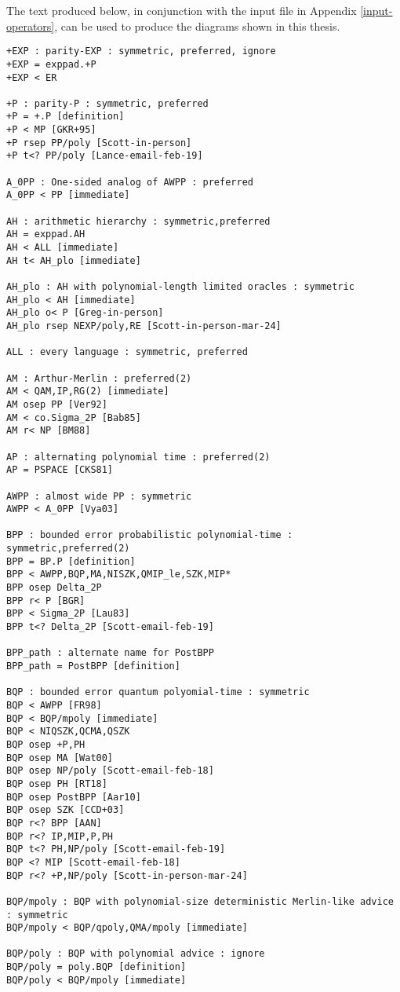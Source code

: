 The text produced below, in conjunction with the input file in Appendix 
\ref{input-operators}, can be used to produce the diagrams shown in this thesis.

\begin{verbatim}
+EXP : parity-EXP : symmetric, preferred, ignore
+EXP = exppad.+P
+EXP < ER

+P : parity-P : symmetric, preferred
+P = +.P [definition]
+P < MP [GKR+95]
+P rsep PP/poly [Scott-in-person]
+P t<? PP/poly [Lance-email-feb-19]

A_0PP : One-sided analog of AWPP : preferred
A_0PP < PP [immediate]

AH : arithmetic hierarchy : symmetric,preferred
AH = exppad.AH
AH < ALL [immediate]
AH t< AH_plo [immediate]

AH_plo : AH with polynomial-length limited oracles : symmetric
AH_plo < AH [immediate]
AH_plo o< P [Greg-in-person]
AH_plo rsep NEXP/poly,RE [Scott-in-person-mar-24]

ALL : every language : symmetric, preferred

AM : Arthur-Merlin : preferred(2)
AM < QAM,IP,RG(2) [immediate]
AM osep PP [Ver92]
AM < co.Sigma_2P [Bab85]
AM r< NP [BM88]

AP : alternating polynomial time : preferred(2)
AP = PSPACE [CKS81]

AWPP : almost wide PP : symmetric
AWPP < A_0PP [Vya03]

BPP : bounded error probabilistic polynomial-time : symmetric,preferred(2)
BPP = BP.P [definition]
BPP < AWPP,BQP,MA,NISZK,QMIP_le,SZK,MIP*
BPP osep Delta_2P
BPP r< P [BGR]
BPP < Sigma_2P [Lau83]
BPP t<? Delta_2P [Scott-email-feb-19]

BPP_path : alternate name for PostBPP
BPP_path = PostBPP [definition]

BQP : bounded error quantum polyomial-time : symmetric
BQP < AWPP [FR98]
BQP < BQP/mpoly [immediate]
BQP < NIQSZK,QCMA,QSZK
BQP osep +P,PH
BQP osep MA [Wat00]
BQP osep NP/poly [Scott-email-feb-18]
BQP osep PH [RT18]
BQP osep PostBPP [Aar10]
BQP osep SZK [CCD+03]
BQP r<? BPP [AAN]
BQP r<? IP,MIP,P,PH
BQP t<? PH,NP/poly [Scott-email-feb-19]
BQP <? MIP [Scott-email-feb-18]
BQP r<? +P,NP/poly [Scott-in-person-mar-24]

BQP/mpoly : BQP with polynomial-size deterministic Merlin-like advice : symmetric
BQP/mpoly < BQP/qpoly,QMA/mpoly [immediate]

BQP/poly : BQP with polynomial advice : ignore
BQP/poly = poly.BQP [definition]
BQP/poly < BQP/mpoly [immediate]


\end{verbatim}
